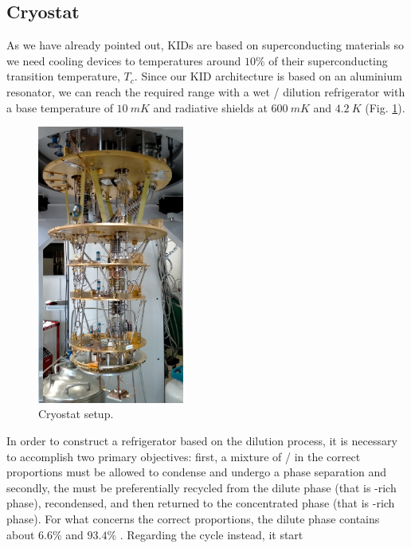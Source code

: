 \documentclass[12pt]{article}
\begin{document}
\subsection{Cryostat}
As we have already pointed out, KIDs are based on superconducting materials so we need cooling devices to temperatures around $10 \%$ of their superconducting transition temperature, $T_c$. Since our KID architecture is based on an aluminium resonator, we can reach the required range with a wet / dilution refrigerator with a base temperature of $10~mK$ and radiative shields at $600~mK$ and $4.2~K$ (Fig. \ref{fig:Cryo}). \\
\begin{figure}
\centering
\vspace{-0.4cm}
    \includegraphics[width=0.43\textwidth]{IMG20210609095242.jpg}
  \caption{\label{fig:Cryo} Cryostat setup.}
\end{figure}
In order to construct a refrigerator based on the dilution process, it is necessary to accomplish two primary objectives: first, a mixture of / in the correct proportions must be allowed to condense and undergo a phase separation and secondly, the  must be preferentially recycled from the dilute phase (that is -rich phase), recondensed, and then returned to the concentrated phase (that is -rich phase). For what concerns the correct proportions, the dilute phase contains about $6.6 \%$  and $93.4 \%$ . Regarding the  cycle instead, it start
\end{document}
